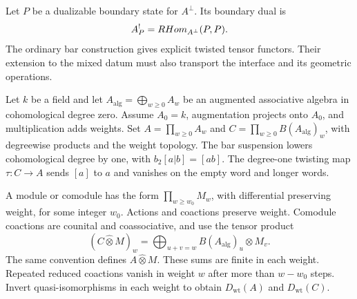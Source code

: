Let $P$ be a dualizable boundary state for $A^\perp$.  Its boundary dual is
\[
 A_P^!=RHom_{A^\perp}(P,P).
\]
The ordinary bar construction gives explicit twisted tensor functors.
Their extension to the mixed datum must also transport the interface and
its geometric operations.

Let $k$ be a field and let $A_{\mathrm{alg}}=\bigoplus_{w\ge0}A_w$
be an augmented associative algebra in cohomological degree zero.
Assume $A_0=k$, augmentation projects onto $A_0$, and multiplication adds weights.
Set $A=\prod_{w\ge0}A_w$ and $C=\prod_{w\ge0}B(A_{\mathrm{alg}})_w$,
with degreewise products and the weight topology.
The bar suspension lowers cohomological degree by one, with $b_2[a|b]=[ab]$.
The degree-one twisting map $\tau:C\to A$ sends $[a]$ to $a$
and vanishes on the empty word and longer words.

A module or comodule has the form $\prod_{w\ge w_0}M_w$,
with differential preserving weight, for some integer $w_0$.
Actions and coactions preserve weight.
Comodule coactions are counital and coassociative, and use the tensor product
\[
 (C\widehat\otimes M)_w
 =\bigoplus_{u+v=w}B(A_{\mathrm{alg}})_u\otimes M_v.
\]
The same convention defines $A\widehat\otimes M$.
These sums are finite in each weight.
Repeated reduced coactions vanish in weight $w$ after more than $w-w_0$ steps.
Invert quasi-isomorphisms in each weight to obtain $D_{\mathrm{wt}}(A)$
and $D_{\mathrm{wt}}(C)$.

